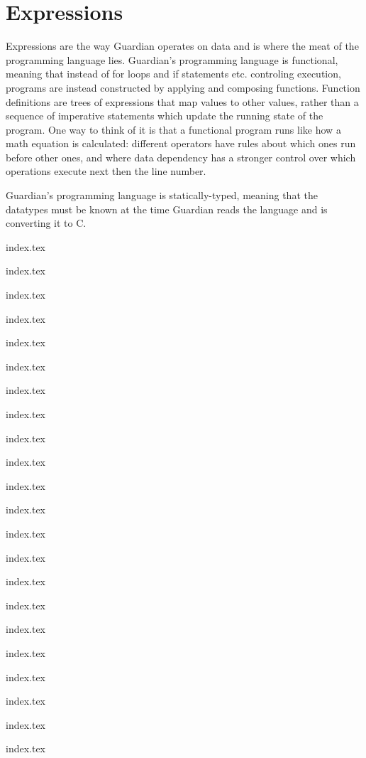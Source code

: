 
\section{Expressions}
{
	Expressions are the way Guardian operates on data and is where the meat
	of the programming language lies.
	Guardian's programming language is functional, meaning that instead of
	for loops and if statements etc. controling execution, programs are
	instead constructed by applying and composing functions. Function
	definitions are trees of expressions that map values to other values,
	rather than a sequence of imperative statements which update
	the running state of the program. One way to think of it is that
	a functional program runs like how a math equation is
	calculated: different operators have rules about which ones run before
	other ones, and where data dependency has a stronger control over which
	operations execute next then the line number.
	
	Guardian's programming language is statically-typed, meaning that the
	datatypes
	must be known at the time Guardian reads the language and is
	converting it to C.
	
	{index.tex}
	
	{index.tex}
	
	{index.tex}
	
	{index.tex}
	
	{index.tex}
	
	{index.tex}
	
	{index.tex}
	
	{index.tex}
	
	{index.tex}
	
	{index.tex}
	
	{index.tex}
	
	{index.tex}
	
	{index.tex}
	
	{index.tex}
	
	{index.tex}
	
	{index.tex}
	
	{index.tex}
	
	{index.tex}
	
	{index.tex}
	
	{index.tex}
	
	{index.tex}
	
	{index.tex}
	
}

